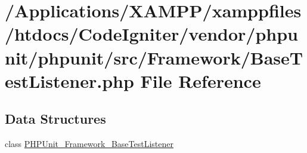 \hypertarget{_framework_2_base_test_listener_8php}{}\section{/\+Applications/\+X\+A\+M\+P\+P/xamppfiles/htdocs/\+Code\+Igniter/vendor/phpunit/phpunit/src/\+Framework/\+Base\+Test\+Listener.php File Reference}
\label{_framework_2_base_test_listener_8php}
\subsection*{Data Structures}
\begin{DoxyCompactItemize}
\item 
class \mbox{\hyperlink{class_p_h_p_unit___framework___base_test_listener}{P\+H\+P\+Unit\+\_\+\+Framework\+\_\+\+Base\+Test\+Listener}}
\end{DoxyCompactItemize}
